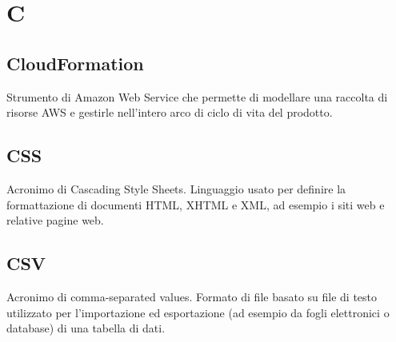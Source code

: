 \section*{C}
\markright{}
\subsection*{CloudFormation}
Strumento di Amazon Web Service che permette di modellare una raccolta di risorse AWS e gestirle nell'intero arco di ciclo di vita del prodotto.
\subsection*{CSS}
Acronimo di Cascading Style Sheets. Linguaggio usato per definire la formattazione di documenti HTML, XHTML e XML, ad esempio i siti web e relative pagine web.
\subsection*{CSV}
Acronimo di comma-separated values. Formato di file basato su file di testo utilizzato per l'importazione ed esportazione (ad esempio da fogli elettronici o database) di una tabella di dati. 